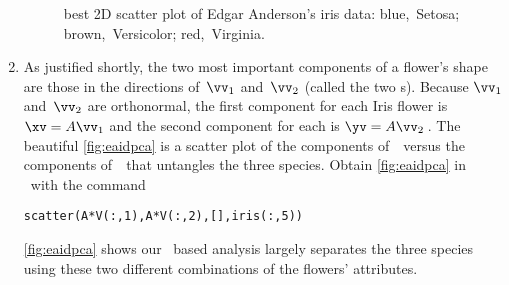 \begin{example}
\begin{solution}
\begin{enumerate}
\begin{figure}
\centering
{}
\caption{best 2D scatter plot of Edgar Anderson's iris data: blue,~Setosa; brown,~Versicolor; red,~Virginia. }
\label{fig:eaidpca}
\end{figure}%
\item As justified shortly, the two most important components of a flower's shape are those in the directions of~\(\vv_1\) and~\(\vv_2\) (called the two s).
Because \(\vv_1\) and~\(\vv_2\) are orthonormal, the first component for each Iris flower is \(\xv=A\vv_1\) and the second component for each is \(\yv=A\vv_2\)\,.
The beautiful \autoref{fig:eaidpca} is a scatter plot of the components of~\yv\ versus the components of~\xv\ that untangles the three species.
Obtain \autoref{fig:eaidpca} in \script\ with the command
\begin{verbatim}
scatter(A*V(:,1),A*V(:,2),[],iris(:,5))
\end{verbatim}
\autoref{fig:eaidpca} shows our \svd\ based analysis largely separates the three species using these two different combinations of the flowers' attributes.
\end{enumerate}
\end{solution}
\end{example}




